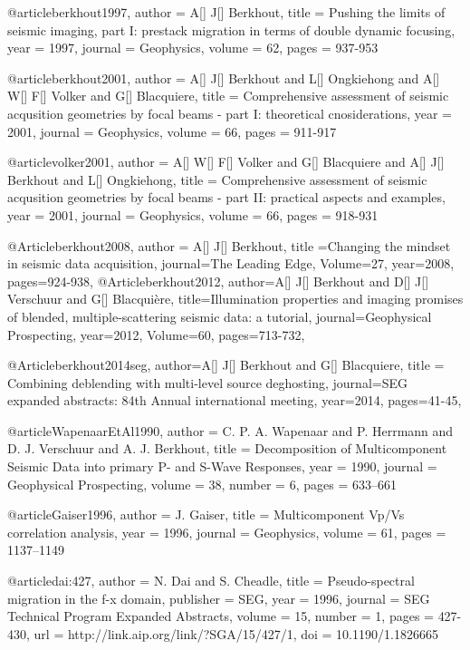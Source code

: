 @article{berkhout1997,
  author =	 {A[] J[] Berkhout},
  title =	 {Pushing the limits of seismic imaging, part I: prestack migration in terms of double dynamic focusing},
  year =	 1997,
  journal =	 {Geophysics},
  volume =	 62,
  pages =	 {937-953}
}

@article{berkhout2001,
  author =	 {A[] J[] Berkhout and L[] Ongkiehong and A[] W[] F[] Volker and G[] Blacquiere},
  title =	 {Comprehensive assessment of seismic acqusition geometries by focal beams - part {I}: theoretical cnosiderations},
  year =	 2001,
  journal =	 {Geophysics},
  volume =	 66,
  pages =	 {911-917}
}

@article{volker2001,
  author =	 {A[] W[] F[] Volker and G[] Blacquiere and A[] J[] Berkhout and L[] Ongkiehong},
  title =	 {Comprehensive assessment of seismic acqusition geometries by focal beams - part {II}: practical aspects and examples},
  year =	 2001,
  journal =	 {Geophysics},
  volume =	 66,
  pages =	 {918-931}
}

@Article{berkhout2008,
  author = {A[] J[] Berkhout},
  title ={Changing the mindset in seismic data acquisition},
  journal={The Leading Edge},
  Volume=27,
  year=2008,
  pages={924-938},
}
@Article{berkhout2012,
  author={A[] J[] Berkhout and D[] J[] Verschuur and G[] Blacqui\`{e}re},
  title={Illumination properties and imaging promises of blended, multiple-scattering seismic data: a tutorial},
  journal={Geophysical Prospecting},
  year=2012,
  Volume=60,
  pages={713-732},
}


@Article{berkhout2014seg,
  author={A[] J[] Berkhout and G[] Blacquiere},
  title = {Combining deblending with multi-level source deghosting},
  journal={SEG expanded abstracts: 84th Annual international meeting},
  year=2014,
  pages={41-45},
}

@article{WapenaarEtAl1990,
  author =	 {C. P. A. Wapenaar and P. Herrmann and
                  D. J. Verschuur and A. J. Berkhout},
  title =	 {Decomposition of Multicomponent Seismic Data into
                  primary {P}- and {S}-Wave Responses},
  year =	 1990,
  journal =	 {Geophysical Prospecting},
  volume =	 38,
  number =	 6,
  pages =	 {633--661}
}



@article{Gaiser1996,
  author =	 {J. Gaiser},
  title =	 {Multicomponent {V}p/{V}s correlation analysis},
  year =	 1996,
  journal =	 {Geophysics},
  volume =	 61,
  pages =	 {1137--1149}
}

@article{dai:427,
  author =	 {N. Dai and S. Cheadle},
  title =	 {Pseudo-spectral migration in the f-x domain},
  publisher =	 {SEG},
  year =	 1996,
  journal =	 {SEG Technical Program Expanded Abstracts},
  volume =	 15,
  number =	 1,
  pages =	 {427-430},
  url =		 {http://link.aip.org/link/?SGA/15/427/1},
  doi =		 {10.1190/1.1826665}
}

